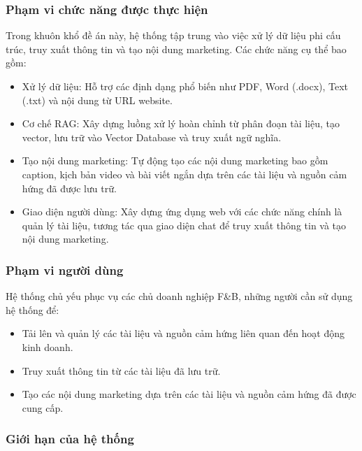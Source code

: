 \subsubsection{Phạm vi chức năng được thực
hiện}\label{phux1ea1m-vi-chux1ee9c-nux103ng-ux111ux1b0ux1ee3c-thux1ef1c-hiux1ec7n}

Trong khuôn khổ đề án này, hệ thống tập trung vào việc xử lý dữ liệu phi
cấu trúc, truy xuất thông tin và tạo nội dung marketing. Các chức năng
cụ thể bao gồm:

\begin{itemize}
\item
  Xử lý dữ liệu: Hỗ trợ các định dạng phổ biến như PDF, Word (.docx),
  Text (.txt) và nội dung từ URL website.
\item
  Cơ chế RAG: Xây dựng luồng xử lý hoàn chỉnh từ phân đoạn tài liệu, tạo
  vector, lưu trữ vào Vector Database và truy xuất ngữ nghĩa.
\item
  Tạo nội dung marketing: Tự động tạo các nội dung marketing bao gồm
  caption, kịch bản video và bài viết ngắn dựa trên các tài liệu và
  nguồn cảm hứng đã được lưu trữ.
\item
  Giao diện người dùng: Xây dựng ứng dụng web với các chức năng chính là
  quản lý tài liệu, tương tác qua giao diện chat để truy xuất thông tin
  và tạo nội dung marketing.
\end{itemize}

\subsubsection{Phạm vi người
dùng}\label{phux1ea1m-vi-ngux1b0ux1eddi-duxf9ng}

Hệ thống chủ yếu phục vụ các chủ doanh nghiệp F\&B, những người cần sử
dụng hệ thống để:

\begin{itemize}
\item
  Tải lên và quản lý các tài liệu và nguồn cảm hứng liên quan đến hoạt
  động kinh doanh.
\item
  Truy xuất thông tin từ các tài liệu đã lưu trữ.
\item
  Tạo các nội dung marketing dựa trên các tài liệu và nguồn cảm hứng đã
  được cung cấp.
\end{itemize}

\subsubsection{Giới hạn của hệ
thống}\label{giux1edbi-hux1ea1n-cux1ee7a-hux1ec7-thux1ed1ng}

